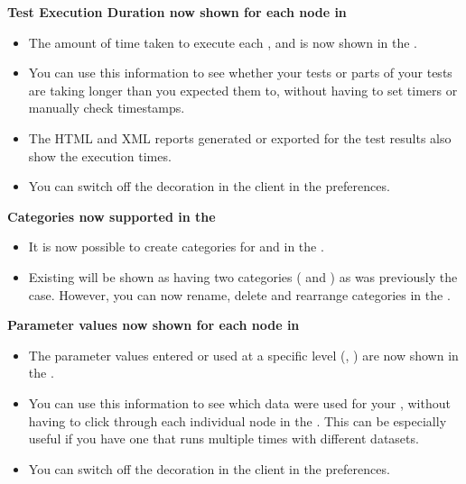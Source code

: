 \textbf{Test Execution Duration now shown for each node in \gdtestresultview{}}\\
\begin{itemize}
\item The amount of time taken to execute each \gdstep{}, \gdcase{} and \gdsuite{} is now shown in the \gdtestresultview{}.
\item You can use this information to see whether your tests or parts of your tests are taking longer than you expected them to, 
without having to set timers or manually check timestamps.
\item The HTML and XML reports generated or exported for the test results also show the execution times.
\item You can switch off the decoration in the \app{} client in the  preferences.
\end{itemize} 

\textbf{Categories now supported in the \gdtestsuitebrowser{}}\\
\begin{itemize}
\item It is now possible to create categories for \gdsuites{} and \gdjobs{} in the \gdtestsuitebrowser{}. 
\item Existing \gdprojects{} will be shown as having two categories ( and ) as was previously the case. However, you can now rename, delete and rearrange categories in the \gdtestsuitebrowser{}. 
\end{itemize} 

\textbf{Parameter values now shown for each node in \gdtestresultview{}}\\
\begin{itemize}
\item The parameter values entered or used at a specific level (\gdcase{}, \gdstep{}) are now shown in the \gdtestresultview{}.
\item You can use this information to see which data were used for your \gdcases{}, without having to click through each individual node in the \gdtestresultview{}. This can be especially useful if you have one \gdcase{} that runs multiple times with different datasets.
\item You can switch off the decoration in the \app{} client in the  preferences.
\end{itemize} 

